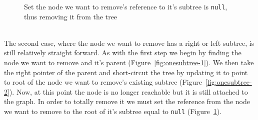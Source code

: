 \hfill
\begin{minipage}{0.3\textwidth}
    \centering
    \vspace{0.75cm}
    \begin{figure}[H]
    \vspace{0.9cm}
    \caption{Set the node we  want to remove's reference to it's subtree is \lstinline|null|, thus removing it from the tree}
    \label{fig:onesubtree-3}
    \end{figure}
\end{minipage}
\vspace{0.25cm}\\

The second case, where the node we want to remove has a right or left subtree,
is still relatively straight forward. As with the first step we begin by
finding the node we want to remove and it's parent
(Figure~\ref{fig:onesubtree-1}).  We then take the right pointer of the parent
and short-circut the tree by updating it to point to root of the node we want 
to remove's existing subtree (Figure~\ref{fig:onesubtree-2}). Now, at this point
the node is no longer reachable but it is still attached to the graph. In order
to totally remove it we must set the reference from the node we want to remove
to the root of it's subtree equal to \lstinline|null| (Figure~\ref{fig:onesubtree-3}).
